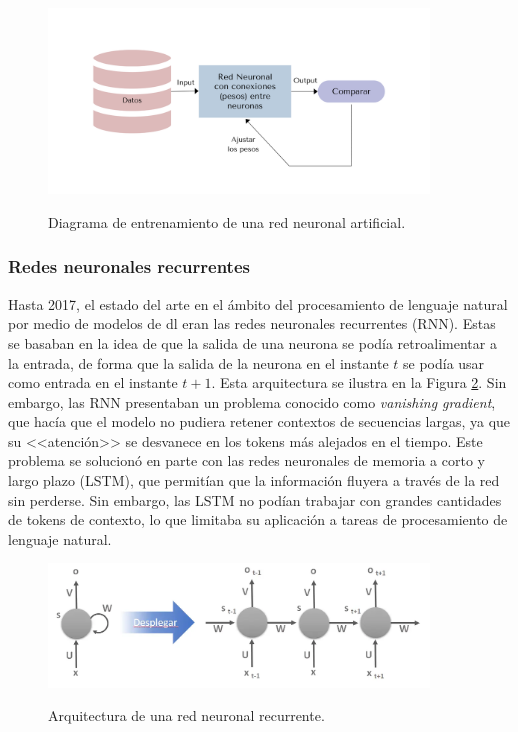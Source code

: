 \begin{figure}[H]
    \caption[Diagrama de entrenamiento de una red neuronal artificial]{Diagrama de entrenamiento de una red neuronal artificial.}
    \centering
    \includegraphics[width=0.9\textwidth]{./figuras/ann_training.png}
    \label{fig:ann_training}
\end{figure}

\subsubsection{Redes neuronales recurrentes}
Hasta 2017, el estado del arte en el ámbito del procesamiento de lenguaje natural por medio de modelos de \gls{dl} eran las redes neuronales recurrentes (RNN). Estas se basaban en la idea de que la salida de una neurona se podía retroalimentar a la entrada, de forma que la salida de la neurona en el instante $t$ se podía usar como entrada en el instante $t+1$. Esta arquitectura se ilustra en la Figura \ref{fig:red_neuronal_recurrente}. Sin embargo, las RNN presentaban un problema conocido como \textit{vanishing gradient}, que hacía que el modelo no pudiera retener contextos de secuencias largas, ya que su <<atención>> se desvanece en los tokens más alejados en el tiempo. Este problema se solucionó en parte con las redes neuronales de memoria a corto y largo plazo (LSTM), que permitían que la información fluyera a través de la red sin perderse. Sin embargo, las LSTM no podían trabajar con grandes cantidades de tokens de contexto, lo que limitaba su aplicación a tareas de procesamiento de lenguaje natural.

\begin{figure}[H]
    \caption[Arquitectura de una red neuronal recurrente]{Arquitectura de una red neuronal recurrente.}
    \centering
    \includegraphics[width=0.9\textwidth]{./figuras/red_neuronal_recurrente.png}
    \label{fig:red_neuronal_recurrente}
\end{figure}


